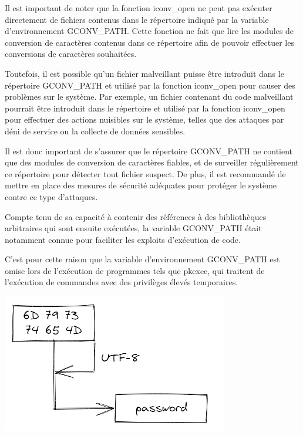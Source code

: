\documentclass[12pt,a4paper]{article}
\begin{document}
\begin{flushleft}
                \item Il est important de noter que la fonction iconv\_open ne peut pas exécuter directement de fichiers contenus dans le répertoire indiqué par la variable d'environnement GCONV\_PATH. Cette fonction ne fait que lire les modules de conversion de caractères contenus dans ce répertoire afin de pouvoir effectuer les conversions de caractères souhaitées.
                \item Toutefois, il est possible qu'un fichier malveillant puisse être introduit dans le répertoire GCONV\_PATH et utilisé par la fonction iconv\_open pour causer des problèmes sur le système. Par exemple, un fichier contenant du code malveillant pourrait être introduit dans le répertoire et utilisé par la fonction iconv\_open pour effectuer des actions nuisibles sur le système, telles que des attaques par déni de service ou la collecte de données sensibles.
                \item Il est donc important de s'assurer que le répertoire GCONV\_PATH ne contient que des modules de conversion de caractères fiables, et de surveiller régulièrement ce répertoire pour détecter tout fichier suspect. De plus, il est recommandé de mettre en place des mesures de sécurité adéquates pour protéger le système contre ce type d'attaques.
                \item Compte tenu de sa capacité à contenir des références à des bibliothèques arbitraires qui sont ensuite exécutées, la variable GCONV\_PATH était notamment connue pour faciliter les exploits d’exécution de code. 
                \item C’est pour cette raison que la variable d’environnement GCONV\_PATH est omise lors de l’exécution de programmes tels que pkexec, qui traitent de l’exécution de commandes avec des privilèges élevés temporaires.
                \begin{center}
                    \includegraphics[scale=0.5]{iconv_open}
                \end{center}
                \cite{iconvman:online}
                \cite{gconvpath:online}

\end{flushleft}
\end{document}
